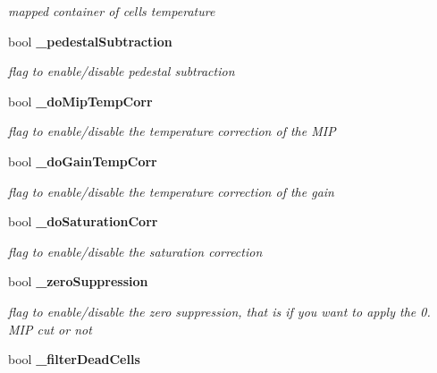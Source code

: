 \begin{DoxyCompactItemize}
\begin{DoxyCompactList}\small\item\em mapped container of cells temperature \end{DoxyCompactList}\item 
bool {\bf \-\_\-pedestal\-Subtraction}\label{classCALICE_1_1SiPMCalibrateProcessor_a62cbf93050afc1ee6e5c7f82fd1f3e66}

\begin{DoxyCompactList}\small\item\em flag to enable/disable pedestal subtraction \end{DoxyCompactList}\item 
bool {\bf \-\_\-do\-Mip\-Temp\-Corr}\label{classCALICE_1_1SiPMCalibrateProcessor_ae71be6f56269b829919d429f1a85e3f8}

\begin{DoxyCompactList}\small\item\em flag to enable/disable the temperature correction of the M\-I\-P \end{DoxyCompactList}\item 
bool {\bf \-\_\-do\-Gain\-Temp\-Corr}\label{classCALICE_1_1SiPMCalibrateProcessor_a2228aa6db6d857d46ce8309bfa4e7026}

\begin{DoxyCompactList}\small\item\em flag to enable/disable the temperature correction of the gain \end{DoxyCompactList}\item 
bool {\bf \-\_\-do\-Saturation\-Corr}\label{classCALICE_1_1SiPMCalibrateProcessor_adda23df94c9acdcc5374d17bb956dfcc}

\begin{DoxyCompactList}\small\item\em flag to enable/disable the saturation correction \end{DoxyCompactList}\item 
bool {\bf \-\_\-zero\-Suppression}\label{classCALICE_1_1SiPMCalibrateProcessor_a1c5afe234b4e0f55c2da524153dbd2ff}

\begin{DoxyCompactList}\small\item\em flag to enable/disable the zero suppression, that is if you want to apply the 0. M\-I\-P cut or not \end{DoxyCompactList}\item 
bool {\bf \-\_\-filter\-Dead\-Cells}\label{classCALICE_1_1SiPMCalibrateProcessor_a12a78cade56b09367209139fac783c14}


\end{DoxyCompactItemize}
